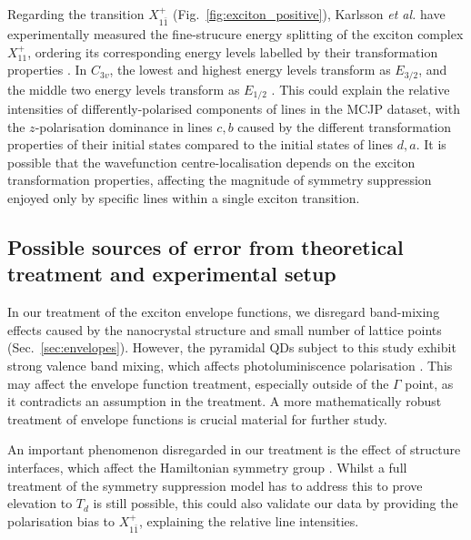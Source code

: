 Regarding the transition $X^+_{1\bar{1}}$ (Fig.~\ref{fig:exciton_positive}), Karlsson \textit{et al.} have experimentally measured the fine-strucure energy splitting of the exciton complex $X^+_{11}$, ordering its corresponding energy levels labelled by their transformation properties \cite[p.~16]{karlsson}. In $C_{3v}$, the lowest and highest energy levels transform as $E_{3/2}$, and the middle two energy levels transform as $E_{1/2}$ \cite[Fig.~17]{karlsson}. This could explain the relative intensities of differently-polarised components of lines in the MCJP dataset, with the $z$-polarisation dominance in lines $c,b$ caused by the different transformation properties of their initial states compared to the initial states of lines $d,a$. It is possible that the wavefunction centre-localisation depends on the exciton transformation properties, affecting the magnitude of symmetry suppression enjoyed only by specific lines within a single exciton transition.

\subsection{Possible sources of error from theoretical treatment and experimental setup}

In our treatment of the exciton envelope functions, we disregard band-mixing effects caused by the nanocrystal structure and small number of lattice points (Sec.~\ref{sec:envelopes}). However, the pyramidal QDs subject to this study exhibit strong valence band mixing, which affects photoluminiscence polarisation \cite{strong_band_mixing}. This may affect the envelope function treatment, especially outside of the $\Gamma$ point, as it contradicts an assumption in the treatment. A more mathematically robust treatment of envelope functions is crucial material for further study.

An important phenomenon disregarded in our treatment is the effect of structure interfaces, which affect the Hamiltonian symmetry group \cite{interfaces}. Whilst a full treatment of the symmetry suppression model has to address this to prove elevation to $T_d$ is still possible, this could also validate our data by providing the polarisation bias to $X^+_{1\bar{1}}$, explaining the relative line intensities.

